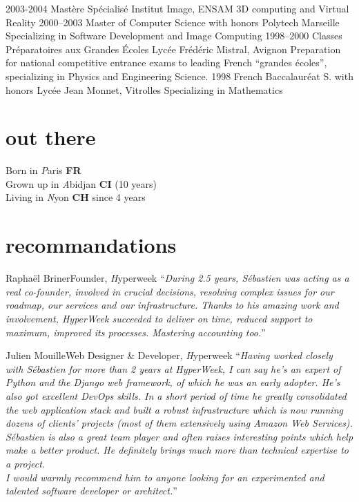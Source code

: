 \documentclass[]{friggeri}
\begin{document}
\begin{entrylist}
  \entry
    {2003-2004}
    {Mastère Spécialisé}
    {Institut Image, ENSAM}
    {3D computing and Virtual Reality}
  \entry
    {2000–2003}
    {Master of Computer Science with honors}
    {Polytech Marseille}
    {Specializing in Software Development and Image Computing}
  \entry
    {1998–2000}
    {Classes Préparatoires aux Grandes Écoles}
    {Lycée Frédéric Mistral, Avignon}
    {Preparation for national competitive entrance exams to leading French
    ``grandes écoles'', specializing in Physics and Engineering Science.}
  \entry
    {1998}
    {French Baccalauréat S. with honors}
    {Lycée Jean Monnet, Vitrolles}
    {Specializing in Mathematics}
\end{entrylist}

\section{out there}

{\FA \faMapMarker} Born in {\emph Paris} {\bf FR}\\
{\FA \faPlane} Grown up in {\emph Abidjan} {\bf CI} (10 years)\\
{\FA \faPlane} Living in {\emph Nyon} {\bf CH} since 4 years

\clearpage

\section{recommandations}

\begin{quoting}{Raphaël Briner}{Founder, {\emph Hyperweek}}
``\textit{During 2.5 years, Sébastien was acting as a real co-founder,
involved in crucial decisions, resolving complex issues for our roadmap, our
services and our infrastructure. Thanks to his amazing work and involvement,
HyperWeek succeeded to deliver on time, reduced support to maximum, improved
its processes. Mastering accounting too.}''
\end{quoting}

\begin{quoting}{Julien Mouille}{Web Designer \& Developer, {\emph Hyperweek}}
``\textit{Having worked closely with Sébastien for more than 2 years at
HyperWeek, I can say he's an expert of Python and the Django web framework, of
which he was an early adopter. He's also got excellent DevOps skills. In a
short period of time he greatly consolidated the web application stack and
built a robust infrastructure which is now running dozens of clients' projects
(most of them extensively using Amazon Web Services).\\
Sébastien is also a great team player and often raises interesting points
which help make a better product. He definitely brings much more than
technical expertise to a project.\\
I would warmly recommend him to anyone looking for an experimented and
talented software developer or architect.}''
\end{quoting}
\end{document}
